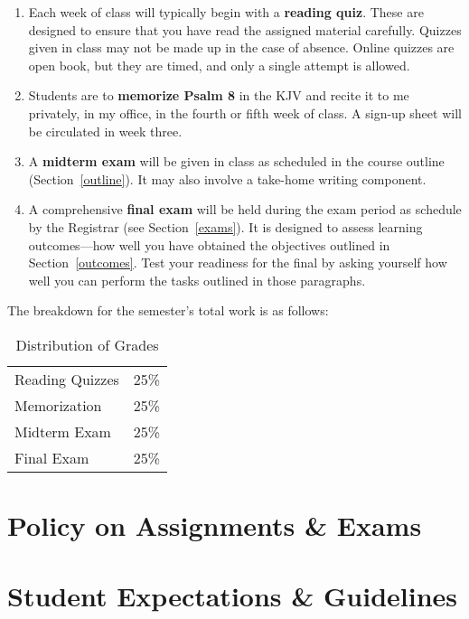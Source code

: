 \documentclass[titlepage]{article}
\newcommand\policy{../policy}
\begin{document}
\begin{enumerate}
 \item Each week of class will typically begin with a \textbf{reading
   quiz}. These are designed to ensure that you have read the assigned
   material carefully. Quizzes given in class may not be made up in the
   case of absence. Online quizzes are open book, but they are timed,
   and only a single attempt is allowed.
 \item Students are to \textbf{memorize Psalm 8} in the KJV and recite
   it to me privately, in my office, in the fourth or fifth week of
   class. A sign-up sheet will be circulated in week three.
 \item A \textbf{midterm exam} will be given in class as scheduled in
   the course outline (Section~\ref{outline}). It may also involve a
   take-home writing component.
 \item A comprehensive \textbf{final exam} will be held during the exam
   period as schedule by the Registrar (see Section~\ref{exams}). It is
   designed to assess learning outcomes---how well you have obtained the
   objectives outlined in Section~\ref{outcomes}. Test your readiness
   for the final by asking yourself how well you can perform the tasks
   outlined in those paragraphs.
\end{enumerate}

The breakdown for the semester's total work is as follows:

\begin{table}[htbp]
  \centering
  \begin{tabular}{lr}
    \toprule
    Reading Quizzes & 25\% \\
    Memorization    & 25\% \\
    Midterm Exam    & 25\% \\
    Final Exam      & 25\% \\
    \bottomrule
  \end{tabular}
  \caption{Distribution of Grades}
  \label{distribution}
\end{table}



\section{Policy on Assignments \& Exams}
\label{policy}





\section{Student Expectations \& Guidelines}
\label{expectations}
\end{document}
